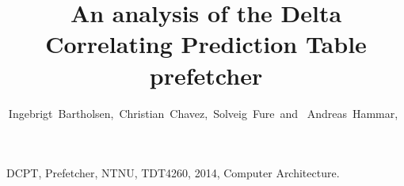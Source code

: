 \documentclass[journal]{IEEEtran}
\begin{document}
\title{An analysis of the Delta Correlating Prediction Table prefetcher}

\author{Ingebrigt~Bartholsen,~Christian~Chavez,~Solveig~Fure~and ~Andreas~Hammar,~}




\maketitle



\begin{IEEEkeywords}
DCPT, Prefetcher, NTNU, TDT4260, 2014, Computer Architecture.
\end{IEEEkeywords}
\IEEEpeerreviewmaketitle

















\appendices




\end{document}
